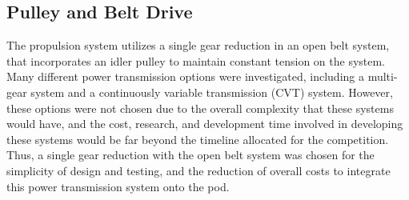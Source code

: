 \documentclass[main.tex]{subfiles}
\begin{document}
    \subsection{Pulley and Belt Drive}
The propulsion system utilizes a single gear reduction in an open belt system, that incorporates an idler pulley to maintain constant tension on the system. Many different power transmission options were investigated, including a multi-gear system and a continuously variable transmission (CVT) system. However, these options were not chosen due to the overall complexity that these systems would have, and the cost, research, and development time involved in developing these systems would be far beyond the timeline allocated for the competition. Thus, a single gear reduction with the open belt system was chosen for the simplicity of design and testing, and the reduction of overall costs to integrate this power transmission system onto the pod.\\
\end{document}
